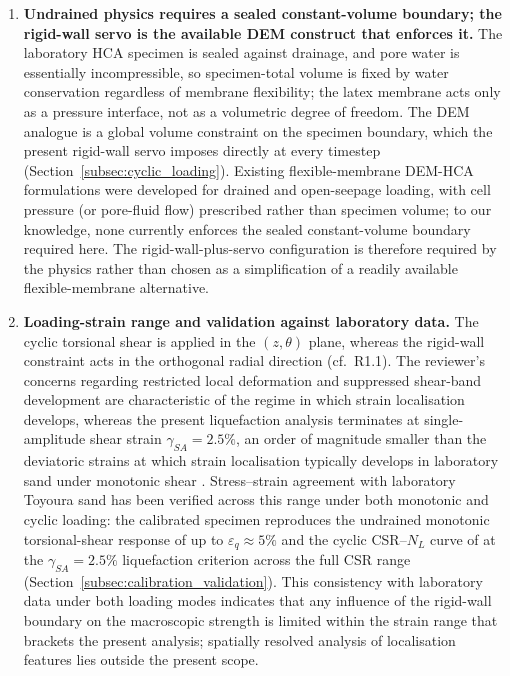 \documentclass[11pt,a4paper]{article}
\begin{document}
\begin{enumerate}[leftmargin=*,label=(\arabic*),topsep=4pt,itemsep=6pt]
\item \textbf{Undrained physics requires a sealed constant-volume
boundary; the rigid-wall servo is the available DEM construct that
enforces it.}
The laboratory HCA specimen is sealed against drainage, and pore
water is essentially incompressible, so specimen-total volume is
fixed by water conservation regardless of membrane flexibility; the
latex membrane acts only as a pressure interface, not as a
volumetric degree of freedom. The DEM analogue is a global volume
constraint on the specimen boundary, which the present rigid-wall
servo imposes directly at every timestep
(Section~\ref{subsec:cyclic_loading}). Existing flexible-membrane
DEM-HCA formulations \citep{Song2024,Song2024suffusion} were
developed for drained and open-seepage loading, with cell pressure
(or pore-fluid flow) prescribed rather than specimen volume; to our
knowledge, none currently enforces the sealed constant-volume
boundary required here. The rigid-wall-plus-servo configuration is
therefore required by the physics rather than chosen as a
simplification of a readily available flexible-membrane alternative.

\item \textbf{Loading-strain range and validation against laboratory
data.}
The cyclic torsional shear is applied in the $(z,\theta)$ plane,
whereas the rigid-wall constraint acts in the orthogonal radial
direction (cf.\ R1.1). The reviewer's concerns regarding restricted
local deformation and suppressed shear-band development are
characteristic of the regime in which strain localisation develops,
whereas the present liquefaction analysis
terminates at single-amplitude shear strain $\gamma_{SA} = 2.5\%$,
an order of magnitude smaller than the deviatoric strains at which
strain localisation typically develops in laboratory sand under
monotonic shear \citep[e.g.,][]{DesruesViggiani2004}. Stress--strain
agreement with laboratory Toyoura sand has been verified across
this range under both monotonic and cyclic loading: the calibrated
specimen reproduces the undrained monotonic torsional-shear response
of \citet{Nakata1998} up to $\varepsilon_q \approx 5\%$ and the
cyclic CSR--$N_L$ curve of \citet{Ishihara1985} at the
$\gamma_{SA} = 2.5\%$ liquefaction criterion across the full CSR
range (Section~\ref{subsec:calibration_validation}). This
consistency with laboratory data under both loading modes
indicates that any
influence of the rigid-wall boundary on the macroscopic strength
is limited within the strain range that brackets the present
analysis; spatially resolved analysis of localisation features lies
outside the present scope.
\end{enumerate}
\end{document}
